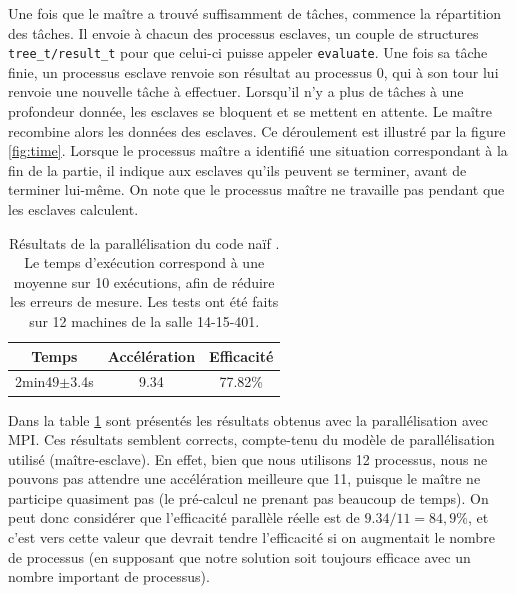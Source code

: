 \documentclass[12pt]{article}
\begin{document}
    \par Une fois que le maître a trouvé suffisamment de tâches, commence la
    répartition des tâches. Il envoie à chacun des processus esclaves, un
    couple de structures \texttt{tree\_t/result\_t} pour que celui-ci puisse
    appeler \texttt{evaluate}. Une fois sa tâche finie, un processus esclave 
    renvoie son résultat au processus 0, qui à son tour lui renvoie une
    nouvelle tâche à effectuer. Lorsqu'il n'y a plus de tâches à une profondeur
    donnée, les esclaves se bloquent et se mettent en attente. Le maître
    recombine alors les données des esclaves. Ce déroulement est illustré par
    la figure \ref{fig:time}. Lorsque le processus maître a identifié une
    situation correspondant à la fin de la partie, il indique aux esclaves
    qu'ils peuvent se terminer, avant de terminer lui-même.
    On note que le processus maître ne travaille pas pendant que les esclaves
    calculent.\\
    \begin{table} \begin{center}
        \begin{tabular}{|c|c|c|}
            \hline
            \textbf{Temps}      &   \textbf{Accélération}   &   \textbf{Efficacité} \\ \hline
            2min49$\pm$3.4s      &   9.34                   &   77.82\% \\ \hline
        \end{tabular}
        \caption{\label{tab:mpi1}Résultats de la parallélisation du code \og naïf \fg. Le temps
        d'exécution correspond à une moyenne sur 10 exécutions, afin de réduire les erreurs de
        mesure. Les tests ont été faits sur 12 machines de la salle 14-15-401.}
    \end{center} \end{table}
    \par Dans la table \ref{tab:mpi1} sont présentés les résultats obtenus avec
    la parallélisation avec MPI. Ces résultats semblent corrects, compte-tenu
    du modèle de parallélisation utilisé (maître-esclave). En effet, bien que nous 
    utilisons 12 processus, nous ne pouvons pas attendre une accélération meilleure que 11,
    puisque le maître ne participe quasiment pas (le pré-calcul ne prenant pas beaucoup de temps).
    On peut donc considérer que l'efficacité parallèle réelle est de $9.34/11 = 84,9\%$, 
    et c'est vers cette valeur que devrait tendre l'efficacité si on augmentait
    le nombre de processus (en supposant que notre solution soit toujours
    efficace avec un nombre important de processus).
\end{document}
